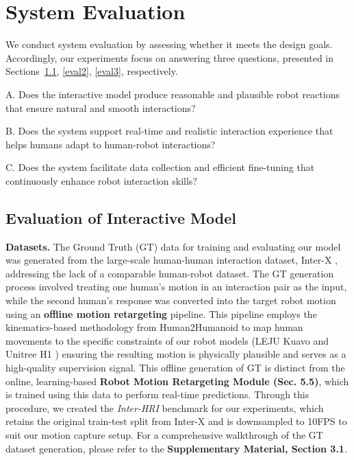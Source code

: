 \section{System Evaluation}

We conduct system evaluation by assessing whether it meets the design goals. Accordingly, our experiments focus on answering three questions, presented in Sections~\ref{eval1}, \ref{eval2}, \ref{eval3}, respectively.

A. Does the interactive model produce reasonable and plausible robot reactions that ensure natural and smooth interactions?

B. Does the system support real-time and realistic interaction experience that helps humans adapt to human-robot interactions?

C. Does the system facilitate data collection and efficient fine-tuning that continuously enhance robot interaction skills?

\subsection{Evaluation of Interactive Model}
\label{eval1}
\noindent\textbf{Datasets.}
The Ground Truth (GT) data for training and evaluating our model was generated from the large-scale human-human interaction dataset, Inter-X \cite{xu2024inter}, addressing the lack of a comparable human-robot dataset. The GT generation process involved treating one human's motion in an interaction pair as the input, while the second human's response was converted into the target robot motion using an \textbf{offline motion retargeting} pipeline. This pipeline employs the kinematics-based methodology from Human2Humanoid \cite{he2024learning} to map human movements to the specific constraints of our robot models (LEJU Kuavo \cite{lejukuavorobot} and Unitree H1 \cite{unitreeh1robot}) ensuring the resulting motion is physically plausible and serves as a high-quality supervision signal. This offline generation of GT is distinct from the online, learning-based \textbf{Robot Motion Retargeting Module (Sec. 5.5)}, which is trained using this data to perform real-time predictions. Through this procedure, we created the \textit{Inter-HRI} benchmark for our experiments, which retains the original train-test split from Inter-X and is downsampled to 10FPS to suit our motion capture setup. For a comprehensive walkthrough of the GT dataset generation, please refer to the \textbf{Supplementary Material, Section 3.1}.



